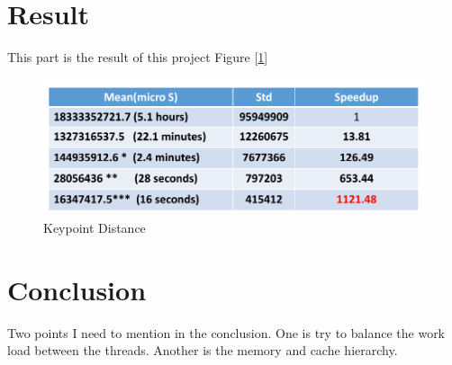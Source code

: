\documentclass[journal]{IEEEtran}
\begin{document}
\section{Result}
This part is the result of this project Figure [\ref{fig:figure10}]
		\begin{figure}[h]
			\centering
			\includegraphics[scale=0.25]{Figure/Result.png}
			\caption{ Keypoint Distance }
			\label{fig:figure10}
		\end{figure} 
		
\section{Conclusion}
Two points I need to mention in the conclusion. 
One is try to balance the work load between the threads. Another is the memory and cache hierarchy. 
\end{document}

